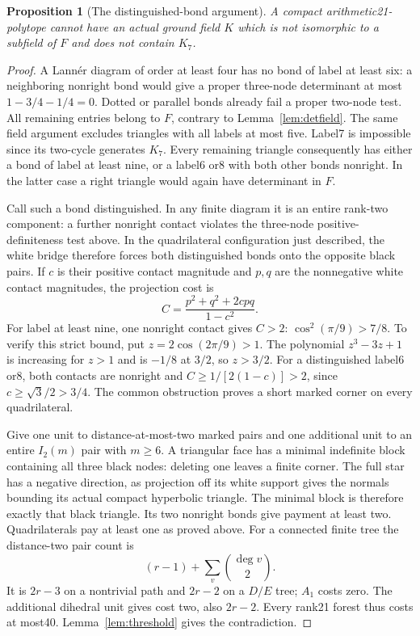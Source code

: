 \documentclass[11pt]{article}
\newtheorem{proposition}[theorem]{Proposition}
\begin{document}
\begin{proposition}[The distinguished-bond argument]\label{prop:highfield}
A compact arithmetic21-polytope cannot have an actual ground field
$K$ which is not isomorphic to a subfield of $F$ and does not contain
$K_7$.
\end{proposition}
\begin{proof}
A Lann\'er diagram of order at least four has no bond of label
at least six: a neighboring nonright bond would give a proper
three-node determinant at most $1-3/4-1/4=0$. Dotted or parallel
bonds already fail a proper two-node test. All remaining entries
belong to $F$, contrary to Lemma~\ref{lem:detfield}. The same field
argument excludes triangles with all labels at most five. Label7
is impossible since its two-cycle generates $K_7$. Every remaining
triangle consequently has either a bond of label at least nine,
or a label6 or8 with both other bonds nonright. In the latter case
a right triangle would again have determinant in $F$.

Call such a bond distinguished. In any finite diagram it is an
entire rank-two component: a further nonright contact violates the
three-node positive-definiteness test above. In the quadrilateral
configuration just described, the white bridge therefore forces both
distinguished bonds onto the opposite black pairs.
If $c$ is their positive contact magnitude and $p,q$ are the
nonnegative white contact magnitudes, the projection cost is
\[
 C=\frac{p^2+q^2+2cpq}{1-c^2}.
\]
For label at least nine, one nonright contact gives $C>2$:
$\cos^2(\pi/9)>7/8$. To verify this strict bound, put
$z=2\cos(2\pi/9)>1$. The polynomial $z^3-3z+1$ is increasing
for $z>1$ and is $-1/8$ at $3/2$, so $z>3/2$.
For a distinguished label6 or8, both contacts are nonright and
$C\ge1/[2(1-c)]>2$, since $c\ge\sqrt3/2>3/4$.
The common obstruction proves a short marked corner on every quadrilateral.

Give one unit to distance-at-most-two marked pairs and one additional
unit to an entire $I_2(m)$ pair with $m\ge6$. A triangular face has
a minimal indefinite block containing all three black nodes: deleting
one leaves a finite corner. The full star has a negative direction,
as projection off its white support gives the normals bounding its
actual compact hyperbolic triangle. The minimal block is therefore
exactly that black triangle. Its two nonright bonds give payment
at least two. Quadrilaterals pay at least one as proved above.
For a connected finite tree the distance-two pair count is
\[
 (r-1)+\sum_v\binom{\deg v}{2}.
\]
It is $2r-3$ on a nontrivial path and $2r-2$ on a $D/E$ tree;
$A_1$ costs zero. The additional dihedral unit gives cost two,
also $2r-2$. Every rank21 forest thus costs at most40.
Lemma~\ref{lem:threshold} gives the contradiction.
\end{proof}
\end{document}

